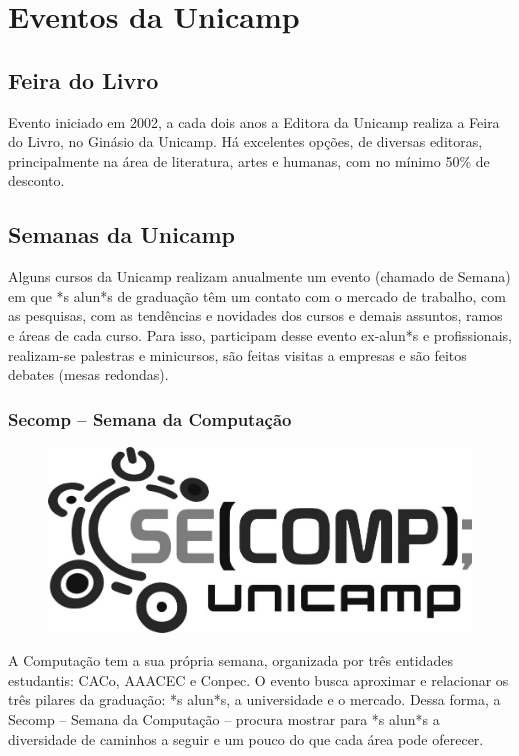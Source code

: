 
\section{Eventos da Unicamp}
\subsection{Feira do Livro}

Evento iniciado em 2002, a cada dois anos a Editora da Unicamp realiza a Feira
do Livro, no Ginásio da Unicamp. Há excelentes opções, de diversas editoras,
principalmente na área de literatura, artes e humanas, com no mínimo 50\% de
desconto.

\subsection{Semanas da Unicamp}

Alguns cursos da Unicamp realizam anualmente um evento (chamado de Semana) em
que *s alun*s de graduação têm um contato com o mercado de trabalho, com as
pesquisas, com as tendências e novidades dos cursos e demais assuntos, ramos e
áreas de cada curso. Para isso, participam desse evento ex-alun*s e
profissionais, realizam-se palestras e minicursos, são feitas visitas a empresas
e são feitos debates (mesas redondas).

\subsubsection*{Secomp -- Semana da Computação}

\begin{figure}[H]
    \centering
    \includegraphics[width=.35\textwidth]{img/alem_da_graduacao/secomp_logo.png}
\end{figure}

A Computação tem a sua própria semana, organizada por três entidades estudantis:
CACo, AAACEC e Conpec. O evento busca aproximar e relacionar os três pilares da
graduação: *s alun*s, a universidade e o mercado. Dessa forma, a Secomp --
Semana da Computação -- procura mostrar para *s alun*s a diversidade de caminhos
a seguir e um pouco do que cada área pode oferecer.

